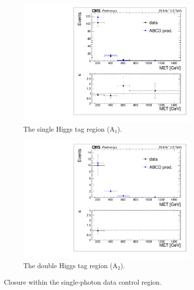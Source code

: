\begin{figure}[htbp]
\begin{subfigure}[b]{0.5\textwidth}
\centering
\includegraphics[trim={5px 5px 5px 5px},clip,width=\textwidth]{figs/SUS17006/dataClosure_single-tagSR_photon.pdf}
\caption{The single Higgs tag region (A$_{1}$).}
\end{subfigure}
\begin{subfigure}[b]{0.5\textwidth}
\centering
\includegraphics[trim={5px 5px 5px 5px},clip,width=\textwidth]{figs/SUS17006/dataClosure_double-tagSR_photon.pdf} 
\caption{The double Higgs tag region (A$_{2}$).}
\end{subfigure}
\caption{Closure within the single-photon data control region.}
\label{fig:closurephoton}
\end{figure}

